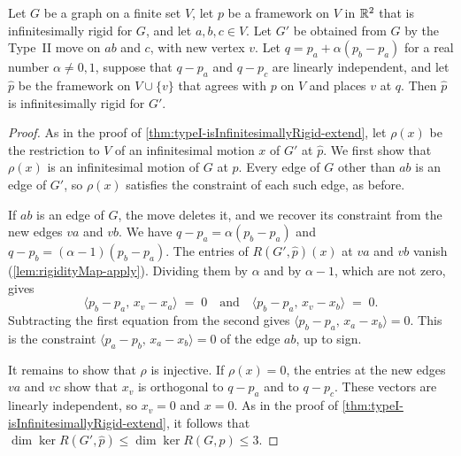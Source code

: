\begin{theorem}
  \label{thm:typeII-isInfinitesimallyRigid-extend}
  \leanok
  Let $G$ be a graph on a finite set $V$, let $p$ be a framework on
  $V$ in ${\mathbb{R}}^{2}$ that is infinitesimally rigid for $G$, and let
  $a, b, c \in V$. Let $G'$ be obtained from $G$ by the Type~II move
  on $ab$ and $c$, with new vertex $v$. Let
  $q = p_a + \alpha (p_b - p_a)$ for a real number $\alpha \ne 0, 1$,
  suppose that $q - p_a$ and $q - p_c$ are linearly independent, and
  let $\hat p$ be the framework on $V \cup \{v\}$ that agrees with $p$
  on $V$ and places $v$ at $q$. Then $\hat p$ is infinitesimally rigid
  for $G'$.
\end{theorem}
\begin{proof}
  \leanok
  As in the proof of \cref{thm:typeI-isInfinitesimallyRigid-extend},
  let $\rho(x)$ be the restriction to $V$ of an infinitesimal motion
  $x$ of $G'$ at $\hat p$. We first show that $\rho(x)$ is an
  infinitesimal motion of $G$ at $p$. Every edge of $G$ other than
  $ab$ is an edge of $G'$, so $\rho(x)$ satisfies the constraint of
  each such edge, as before.

  If $ab$ is an edge of $G$, the move deletes it, and we recover its
  constraint from the new edges $va$ and $vb$. We have
  $q - p_a = \alpha (p_b - p_a)$ and
  $q - p_b = (\alpha - 1)(p_b - p_a)$. The entries of
  $R(G', \hat p)(x)$ at $va$ and $vb$ vanish
  (\cref{lem:rigidityMap-apply}). Dividing them by $\alpha$ and by
  $\alpha - 1$, which are not zero, gives
  \[
    \langle p_b - p_a,\, x_v - x_a \rangle \;=\; 0
    \quad\text{and}\quad
    \langle p_b - p_a,\, x_v - x_b \rangle \;=\; 0.
  \]
  Subtracting the first equation from the second gives
  $\langle p_b - p_a,\, x_a - x_b \rangle = 0$. This is the
  constraint $\langle p_a - p_b,\, x_a - x_b \rangle = 0$ of the edge
  $ab$, up to sign.

  It remains to show that $\rho$ is injective. If $\rho(x) = 0$, the
  entries at the new edges $va$ and $vc$ show that $x_v$ is
  orthogonal to $q - p_a$ and to $q - p_c$. These vectors are linearly
  independent, so $x_v = 0$ and $x = 0$. As in the proof of
  \cref{thm:typeI-isInfinitesimallyRigid-extend}, it follows that
  $\dim \ker R(G', \hat p) \le \dim \ker R(G, p) \le 3$.
\end{proof}

